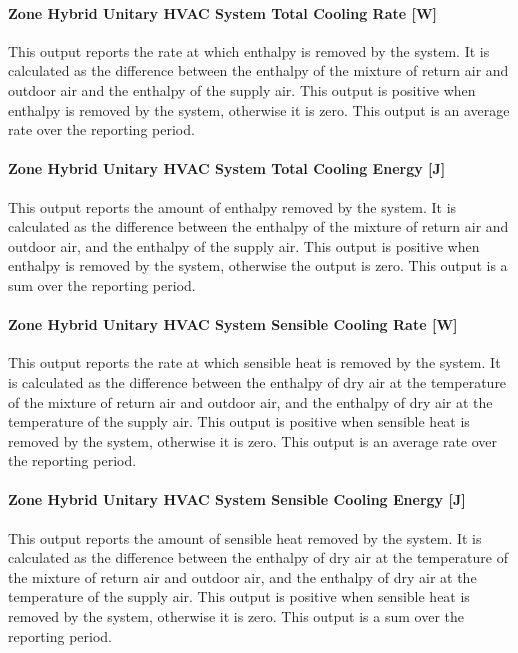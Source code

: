 \paragraph{Zone Hybrid Unitary HVAC System Total Cooling Rate [W]}
This output reports the rate at which enthalpy is removed by the system. It is calculated as the difference between the enthalpy of the mixture of return air and outdoor air and the enthalpy of the supply air. This output is positive when enthalpy is removed by the system, otherwise it is zero. This output is an  average rate over the reporting period.

\paragraph{Zone Hybrid Unitary HVAC System Total Cooling Energy [J]}
This output reports the amount of enthalpy removed by the system. It is calculated as the difference between the enthalpy of the mixture of return air and outdoor air, and the enthalpy of the supply air.  This output is positive when enthalpy is removed by the system, otherwise the output is zero.  This output is a sum over the reporting period.

\paragraph{Zone Hybrid Unitary HVAC System Sensible Cooling Rate [W]}
This output reports the rate at which sensible heat is removed by the system.  It is calculated as the difference between the enthalpy of dry air at the temperature of the mixture of return air and outdoor air, and the enthalpy of dry air at the temperature of the supply air. This output is positive when sensible heat is removed by the system, otherwise it is zero.  This output is an average rate over the reporting period.

\paragraph{Zone Hybrid Unitary HVAC System Sensible Cooling Energy [J]}
This output reports the amount of sensible heat removed by the system.  It is calculated as the difference between the enthalpy of dry air at the temperature of the mixture of return air and outdoor air, and the enthalpy of dry air at the temperature of the supply air. This output is positive when sensible heat is removed by the system, otherwise it is zero. This output is a sum over the reporting period.

